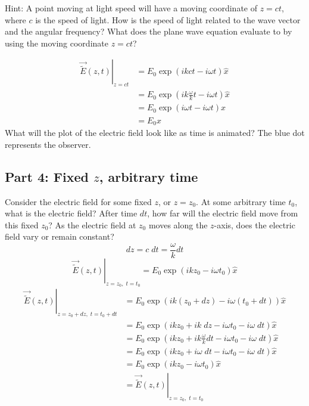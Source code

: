 \documentclass{article}
\begin{document}
Hint: A point moving at light speed will have a moving coordinate of $z=ct$, where $c$ is the speed of light.  How is the speed of light related to the wave vector and the angular frequency?  What does the plane wave equation evaluate to by using the moving coordinate $z=ct$?

\begin{align}
     \left.\vec{\widetilde{E}}\left(z,t\right)\right\rvert_{z=ct} &= E_0 \exp \left(ikct- i \omega t\right) \hat{x}  \\
     &= E_0 \exp \left(ik\frac{\omega}{k}t - i \omega t\right) \hat{x}  \\
     &= E_0 \exp \left(i\omega t- i \omega t\right) \hat{x}  \\
     &= E_0 \hat{x} 
\end{align}
What will the plot of the electric field look like as time is animated?  The blue dot represents the observer.

\subsection{Part 4: Fixed $z$, arbitrary time}
Consider the electric field for some fixed $z$, or $z=z_0$.  At some arbitrary time $t_0$, what is the electric field?  After time $dt$,  how far will the electric field move from this fixed $z_0$?  As the electric field at $z_0$ moves along the $z$-axis, does the electric field vary or remain constant?
\begin{equation}
    dz = c\;dt = \frac{\omega}{k}dt
\end{equation}
\begin{equation}
    \left.\vec{\widetilde{E}}\left(z,t\right)\right\rvert_{z=z_0,\;t=t_0} = E_0 \exp \left(ikz_0- i \omega t_0\right) \hat{x}
\end{equation}
\begin{align}
     \left.\vec{\widetilde{E}}\left(z,t\right)\right\rvert_{z=z_0+dz,\;t=t_0+dt} &= E_0 \exp \left(ik(z_0+dz)- i \omega (t_0+dt)\right) \hat{x}  \\
     &= E_0 \exp \left(ikz_0+ik\;dz- i \omega t_0- i \omega\;dt\right) \hat{x}  \\
     &= E_0 \exp \left(ikz_0+ik\frac{\omega}{k}dt- i \omega t_0- i \omega\;dt\right) \hat{x}  \\
     &= E_0 \exp \left(ikz_0+i\omega\; dt- i \omega t_0- i \omega\;dt\right) \hat{x}  \\
     &= E_0 \exp \left(ikz_0- i \omega t_0\right) \hat{x}  \\
     &=\left.\vec{\widetilde{E}}\left(z,t\right)\right\rvert_{z=z_0,\;t=t_0}
\end{align}
\end{document}
